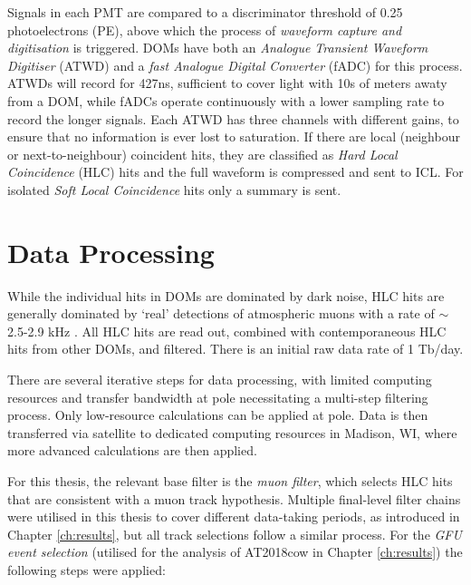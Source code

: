 Signals in each PMT are compared to a discriminator threshold of 0.25 photoelectrons (PE), above which the process of \emph{waveform capture and digitisation} is triggered. DOMs have both an \emph{Analogue Transient Waveform Digitiser} (ATWD)  and a \emph{fast Analogue Digital Converter} (fADC) for this process. ATWDs will record for 427ns, sufficient to cover light with 10s of meters awaty from a DOM, while fADCs operate continuously with a lower sampling rate to record the longer signals. Each ATWD has three channels with different gains, to ensure that no information is ever lost to saturation. If there are local (neighbour or next-to-neighbour) coincident hits, they are classified as \emph{Hard Local Coincidence} (HLC) hits and the full waveform is compressed and sent to ICL. For isolated \emph{Soft Local Coincidence} hits only a summary is sent.

\section{Data Processing}
\label{sec:ic_data}

While the individual hits in DOMs are dominated by dark noise, HLC hits are generally dominated by `real' detections of atmospheric muons with a rate of $\sim$2.5-2.9 kHz \cite{icecube_detector_17}. All HLC hits are read out, combined with contemporaneous HLC hits from other DOMs, and filtered. There is an initial raw data rate of 1 Tb/day. 

There are several iterative steps for data processing, with limited computing resources and transfer bandwidth at pole necessitating a multi-step filtering process. Only low-resource calculations can be applied at pole. Data is then transferred via satellite to dedicated computing resources in Madison, WI, where more advanced calculations are then applied.

For this thesis, the relevant base filter is the \emph{muon filter}, which selects HLC hits that are consistent with a muon track hypothesis. Multiple final-level filter chains were utilised in this thesis to cover different data-taking periods, as introduced in Chapter \ref{ch:results}, but all track selections follow a similar process. For the \emph{GFU event selection} \cite{kintscher_thesis} (utilised for the analysis of AT2018cow in Chapter \ref{ch:results}) the following steps were applied:

